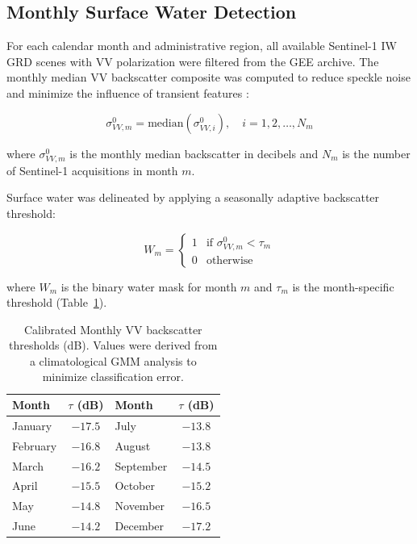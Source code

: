 \documentclass[fleqn,10pt]{article}
\begin{document}
\subsection{Monthly Surface Water Detection}
\label{sec:water_detection}

For each calendar month and administrative region, all available Sentinel-1 IW GRD scenes with VV polarization were filtered from the GEE archive. The monthly median VV backscatter composite was computed to reduce speckle noise and minimize the influence of transient features \cite{clement2018, pham-duc2017}:

\begin{equation}
\sigma^{0}_{VV,m} = \text{median}\left(\sigma^{0}_{VV,i}\right), \quad i = 1, 2, \ldots, N_m
\label{eq:median}
\end{equation}

where $\sigma^{0}_{VV,m}$ is the monthly median backscatter in decibels and $N_m$ is the number of Sentinel-1 acquisitions in month $m$.

Surface water was delineated by applying a seasonally adaptive backscatter threshold:

\begin{equation}
W_{m} =
\begin{cases}
1 & \text{if } \sigma^{0}_{VV,m} < \tau_{m} \\
0 & \text{otherwise}
\end{cases}
\label{eq:threshold}
\end{equation}

where $W_{m}$ is the binary water mask for month $m$ and $\tau_{m}$ is the month-specific threshold (Table~\ref{tab:thresholds}).

\begin{table}[H]
\centering
\caption{Calibrated Monthly VV backscatter thresholds (dB). Values were derived from a climatological GMM analysis to minimize classification error.}
\label{tab:thresholds}
\begin{tabular}{lclc}
\toprule
\textbf{Month} & \textbf{$\tau$ (dB)} & \textbf{Month} & \textbf{$\tau$ (dB)} \\
\midrule
January   & $-17.5$ & July      & $-13.8$ \\
February  & $-16.8$ & August    & $-13.8$ \\
March     & $-16.2$ & September & $-14.5$ \\
April     & $-15.5$ & October   & $-15.2$ \\
May       & $-14.8$ & November  & $-16.5$ \\
June      & $-14.2$ & December  & $-17.2$ \\
\bottomrule
\end{tabular}
\end{table}
\end{document}
